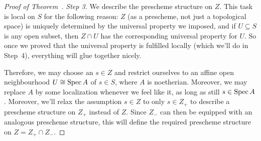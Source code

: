 \documentclass[a4paper,parskip=half,numbers=enddot, DIV=12]{scrreprt}
\begin{document}
\begin{proof}[Proof of Theorem~]
	\emph{Step 3.} We describe the prescheme structure on $Z$. This task is local on $S$ for the following reason: $Z$ (as a prescheme, not just a topological space) is uniquely determined by the universal property we imposed, and if $U\subseteq S$ is any open subset, then $Z\cap U$ has the corresponding universal property for $U$. So once we proved that the universal property is fulfilled locally (which we'll do in Step~4), everything will glue together nicely. 
	
	Therefore, we may choose an $s\in Z$ and restrict ourselves to an affine open neighbourhood $U\cong \operatorname{Spec} A$ of $s\in S$, where $A$ is noetherian. Moreover, we may replace $A$ by some localization whenever we feel like it, as long as still $s\in\operatorname{Spec} A$. Moreover, we'll relax the assumption $s\in Z$ to only $s\in Z_+$ to describe a prescheme structure on $Z_+$ instead of $Z$. Since $Z_-$ can then be equipped with an analogous prescheme structure, this will define the required prescheme structure on $Z=Z_+\cap Z_-$.
	

\end{proof}
\end{document}
